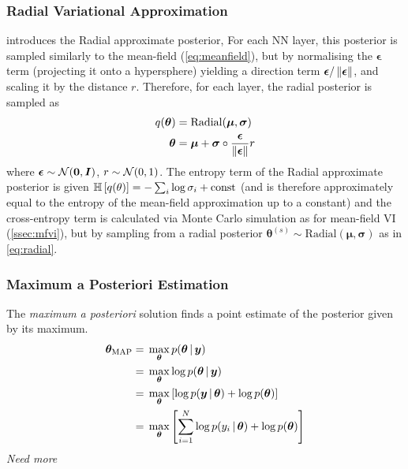 \documentclass[10pt,a4paper,twocolumn]{article}
\begin{document}
\subsubsection{Radial Variational Approximation}
\textcite{farquhar2020radial} introduces the Radial approximate posterior, 
For each NN layer, this posterior is sampled similarly to the mean-field (\cref{eq:meanfield}), but by normalising the \(\bm{\epsilon}\) term (projecting it onto a hypersphere) yielding a direction term \(\bm{\epsilon}/\left\lVert\bm{\epsilon}\right\rVert\), and scaling it by the distance \(r\).
Therefore, for each layer, the radial posterior is sampled as
\begin{align}\label{eq:radial}
    q(\bm \theta) ={}& \mathrm{Radial}(\bm{\mu}, \bm{\sigma}) \nonumber\\
    \bm{\theta} ={}& \bm{\mu} + \bm{\sigma} \circ \frac{\bm{\epsilon}}{\left\lVert\bm{\epsilon}\right\rVert} r
\end{align}
where \(\bm{\epsilon} \sim \mathcal{N}(\bm{0}, \bm{I})\), \(r \sim \mathcal{N}(0, 1)\).
The entropy term of the Radial approximate posterior is given
\(\mathbb{H}\left[q(\theta)\right] = - \sum_i \log \sigma_i + \mathrm{const}\) (and is therefore approximately equal to the entropy of the mean-field approximation up to a constant) and the cross-entropy term is calculated via Monte Carlo simulation as for mean-field VI (\cref{ssec:mfvi}), but by sampling from a radial posterior \(\bm{\theta}^{(s)} \sim \mathrm{Radial}(\bm{\mu}, \bm{\sigma})\) as in \cref{eq:radial}.

\subsubsection{Maximum a Posteriori Estimation}
The \emph{maximum a posteriori} solution finds a point estimate of the posterior given by its maximum.
\begin{align}
    \bm \theta_\mathrm{MAP} 
    ={}& \max_{\bm \theta} p(\bm \theta \, | \, \bm y) \nonumber\\
    ={}& \max_{\bm \theta} \log p(\bm \theta \, | \, \bm y) \nonumber\\
    ={}& \max_{\bm \theta} \left[ \log p(\bm y \, | \, \bm \theta) + \log p(\bm \theta) \right] \nonumber\\
    ={}& \max_{\bm \theta} \left[ \sum_{i=1}^N \log p(y_i \, | \, \bm \theta) + \log p(\bm \theta) \right]
\end{align}
\emph{Need more}
\end{document}
